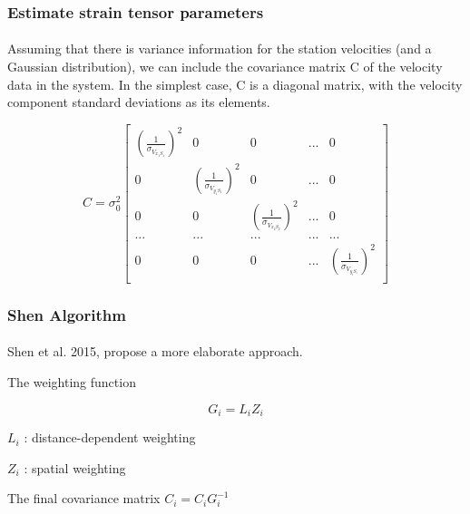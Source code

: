 \begin{frame}
 \frametitle{Estimate strain tensor parameters}
 \framesubtitle{}
 \label{ch2:}
 
 Assuming that there is variance information for the station velocities (and a Gaussian distribution), we can include the covariance matrix C  of the velocity data in the system. In the simplest case, C is a diagonal matrix, with the velocity component standard deviations as its elements.
 
 \[
 C = \sigma_{0}^{2} 
 \begin{bmatrix}
 (\frac{1}{\sigma_{V_{x_{1}S_{1}}}})^{2} & 0 & 0  & ... & 0\\
 0 & (\frac{1}{\sigma_{V_{y_{1}S_{1}}}})^{2} & 0  & ... & 0\\
 0 & 0 & ({\frac{1}{\sigma_{V_{x_{2}S_{2}}}}})^{2} & ... & 0\\
 ... &  ... & ... & ... & ...\\
 0 & 0 & 0 & ... & (\frac{1}{\sigma_{V_{y_{i}S_{i}}}})^{2}\\
 \end{bmatrix}
 \]

\end{frame}
\note{}


\begin{frame}
 \frametitle{Shen Algorithm}
 \framesubtitle{\citep{Shen2015}}
 \label{ch2:}
 
 Shen et al. 2015, propose a more elaborate approach.
 
 The weighting function
 
 \[ G_{i} = L_{i} Z_{i}  \]
 
 $ L_{i} $ : distance-dependent weighting
 
 $ Z_{i} $ : spatial weighting
 
 The final covariance matrix $ C_{i} = C_{i}G_{i}^{-1} $

\end{frame}
\note{}

